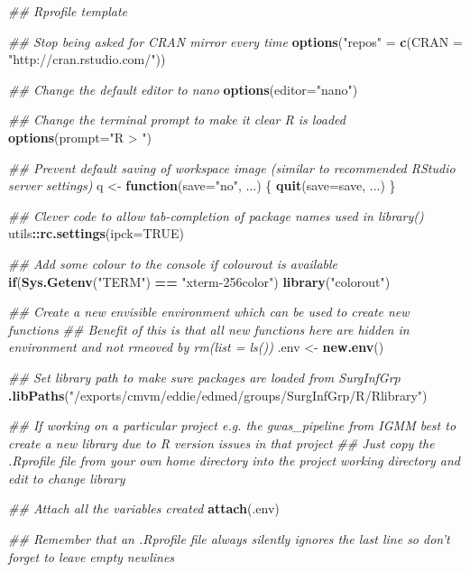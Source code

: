 \documentclass[]{book}
\newenvironment{Shaded}{\begin{snugshade}}{\end{snugshade}}
\newcommand{\CommentTok}[1]{\textcolor[rgb]{0.56,0.35,0.01}{\textit{#1}}}
\newcommand{\ControlFlowTok}[1]{\textcolor[rgb]{0.13,0.29,0.53}{\textbf{#1}}}
\newcommand{\DataTypeTok}[1]{\textcolor[rgb]{0.13,0.29,0.53}{#1}}
\newcommand{\KeywordTok}[1]{\textcolor[rgb]{0.13,0.29,0.53}{\textbf{#1}}}
\newcommand{\NormalTok}[1]{#1}
\newcommand{\OperatorTok}[1]{\textcolor[rgb]{0.81,0.36,0.00}{\textbf{#1}}}
\newcommand{\OtherTok}[1]{\textcolor[rgb]{0.56,0.35,0.01}{#1}}
\newcommand{\StringTok}[1]{\textcolor[rgb]{0.31,0.60,0.02}{#1}}
\begin{document}
\begin{Shaded}
\begin{Highlighting}[]
\CommentTok{## Rprofile template}


\CommentTok{## Stop being asked for CRAN mirror every time}
\KeywordTok{options}\NormalTok{(}\StringTok{"repos"}\NormalTok{ =}\StringTok{ }\KeywordTok{c}\NormalTok{(}\DataTypeTok{CRAN =} \StringTok{"http://cran.rstudio.com/"}\NormalTok{))}


\CommentTok{## Change the default editor to nano}
\KeywordTok{options}\NormalTok{(}\DataTypeTok{editor=}\StringTok{"nano"}\NormalTok{)}

\CommentTok{## Change the terminal prompt to make it clear R is loaded}
\KeywordTok{options}\NormalTok{(}\DataTypeTok{prompt=}\StringTok{"R > "}\NormalTok{)}

\CommentTok{## Prevent default saving of workspace image (similar to recommended RStudio server settings)}
\NormalTok{q <-}\StringTok{ }\ControlFlowTok{function}\NormalTok{(}\DataTypeTok{save=}\StringTok{"no"}\NormalTok{, ...) \{}
        \KeywordTok{quit}\NormalTok{(}\DataTypeTok{save=}\NormalTok{save, ...)}
\NormalTok{\}}


\CommentTok{## Clever code to allow tab-completion of package names used in library()}
\NormalTok{utils}\OperatorTok{::}\KeywordTok{rc.settings}\NormalTok{(}\DataTypeTok{ipck=}\OtherTok{TRUE}\NormalTok{)}


\CommentTok{## Add some colour to the console if colourout is available}
\ControlFlowTok{if}\NormalTok{(}\KeywordTok{Sys.Getenv}\NormalTok{(}\StringTok{"TERM"}\NormalTok{) }\OperatorTok{==}\StringTok{ "xterm-256color"}\NormalTok{)}
        \KeywordTok{library}\NormalTok{(}\StringTok{"colorout"}\NormalTok{)}

\CommentTok{## Create a new envisible environment which can be used to create new functions}
\CommentTok{## Benefit of this is that all new functions here are hidden in environment and not rmeoved by rm(list = ls())}
\NormalTok{.env <-}\StringTok{ }\KeywordTok{new.env}\NormalTok{()}


\CommentTok{## Set library path to make sure packages are loaded from SurgInfGrp}
\KeywordTok{.libPaths}\NormalTok{(}\StringTok{"/exports/cmvm/eddie/edmed/groups/SurgInfGrp/R/Rlibrary"}\NormalTok{)}


\CommentTok{## If working on a particular project e.g. the gwas_pipeline from IGMM best to create a new library due to R version issues in that project}
\CommentTok{## Just copy the .Rprofile file from your own home directory into the project working directory and edit to change library}


\CommentTok{## Attach all the variables created}
\KeywordTok{attach}\NormalTok{(.env)}


\CommentTok{## Remember that an .Rprofile file always silently ignores the last line so don't forget to leave empty newlines}
\end{Highlighting}
\end{Shaded}
\end{document}
